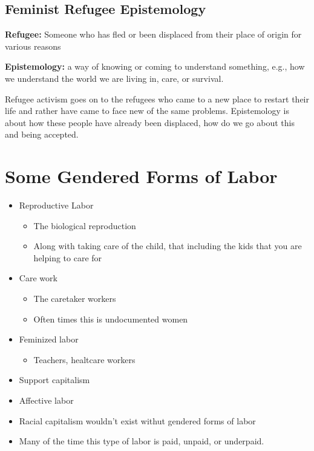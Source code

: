 \documentclass{article}
\begin{document}
\subsection{Feminist Refugee Epistemology}

\textbf{Refugee:} Someone who has fled or been displaced from their place
of origin for various reasons

\textbf{Epistemology:} a way of knowing or coming to understand something, e.g.,
how we understand the world we are living in, care, or survival.

Refugee activism goes on to the refugees who came to a new place
to restart their life and rather have came to face new of the same problems.
Epistemology is about how these people have already been displaced,
how do we go about this and being accepted.

\section{Some Gendered Forms of Labor}
\begin{itemize}
  \item Reproductive Labor
    \begin{itemize}
      \item The biological reproduction
      \item Along with taking care of the child, that including
        the kids that you are helping to care for
    \end{itemize}
  \item Care work
    \begin{itemize}
      \item The caretaker workers
      \item Often times this is undocumented women
    \end{itemize}
  \item Feminized labor
    \begin{itemize}
      \item Teachers, healtcare workers
    \end{itemize}
  \item Support capitalism
  \item Affective labor
  \item Racial capitalism wouldn't exist withut gendered forms of labor
  \item Many of the time this type of labor is paid, unpaid, or underpaid.
\end{itemize}
\end{document}
